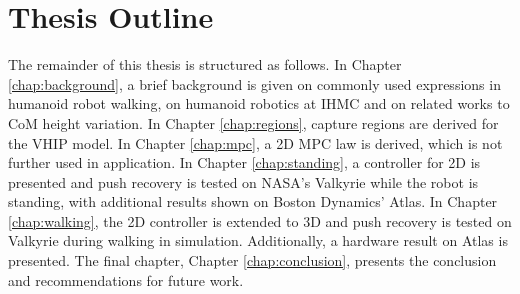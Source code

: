 \section{Thesis Outline}
The remainder of this thesis is structured as follows. In Chapter \ref{chap:background}, a brief background is given on commonly used expressions in humanoid robot walking, on humanoid robotics at \ac{IHMC} and on related works to \ac{CoM} height variation. In Chapter \ref{chap:regions}, capture regions are derived for the \ac{VHIP} model. In Chapter \ref{chap:mpc}, a \ac{2D} \ac{MPC} law is derived, which is not further used in application. In Chapter \ref{chap:standing}, a controller for \ac{2D} is presented and push recovery is tested on NASA's Valkyrie while the robot is standing, with additional results shown on Boston Dynamics' Atlas. In Chapter \ref{chap:walking}, the \ac{2D} controller is extended to \ac{3D} and push recovery is tested on Valkyrie during walking in simulation. Additionally, a hardware result on Atlas is presented. The final chapter, Chapter \ref{chap:conclusion}, presents the conclusion and recommendations for future work.

